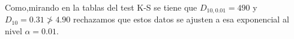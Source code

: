 \documentclass[12pt]{report}
\begin{document}
         Como,mirando en la tablas del test K-S se tiene que $D_{10,0.01}=490$ y $D_{10}=0.31 \not>  4.90$ rechazamos que
estos datos se ajusten a esa exponencial al nivel $\alpha=0.01$. 

           


%     













%      

\end{document}
